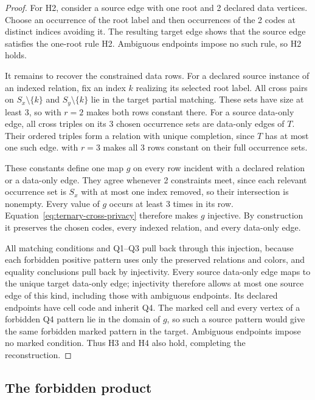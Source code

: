 \documentclass[10pt]{article}
\numberwithin{equation}{section}
\theoremstyle{definition}
\begin{document}
\begin{proof}
For H2, consider a source edge with one root and 2 declared data vertices. Choose an occurrence of the root label and then occurrences of the 2 codes at distinct indices avoiding it. The resulting target edge shows that the source edge satisfies the one-root rule H2. Ambiguous endpoints impose no such rule, so H2 holds.

It remains to recover the constrained data rows. For a declared source instance of an indexed relation, fix an index $k$ realizing its selected root label. All cross pairs on $S_x\setminus\{k\}$ and $S_y\setminus\{k\}$ lie in the target partial matching. These sets have size at least 3, so  with $r=2$ makes both rows constant there. For a source data-only edge, all cross triples on its 3 chosen occurrence sets are data-only edges of $T$. Their ordered triples form a relation with unique completion, since $T$ has at most one such edge.  with $r=3$ makes all 3 rows constant on their full occurrence sets.

These constants define one map $g$ on every row incident with a declared relation or a data-only edge. They agree whenever 2 constraints meet, since each relevant occurrence set is $S_x$ with at most one index removed, so their intersection is nonempty. Every value of $g$ occurs at least 3 times in its row. Equation~\eqref{eq:ternary-cross-privacy} therefore makes $g$ injective. By construction it preserves the chosen codes, every indexed relation, and every data-only edge.

All matching conditions and Q1--Q3 pull back through this injection, because each forbidden positive pattern uses only the preserved relations and colors, and equality conclusions pull back by injectivity. Every source data-only edge maps to the unique target data-only edge; injectivity therefore allows at most one source edge of this kind, including those with ambiguous endpoints. Its declared endpoints have cell code and inherit Q4. The marked cell and every vertex of a forbidden Q4 pattern lie in the domain of $g$, so such a source pattern would give the same forbidden marked pattern in the target. Ambiguous endpoints impose no marked condition. Thus H3 and H4 also hold, completing the reconstruction.
\end{proof}

\subsection{The forbidden product}\label{sec:final-singleton-reduction}
\end{document}
